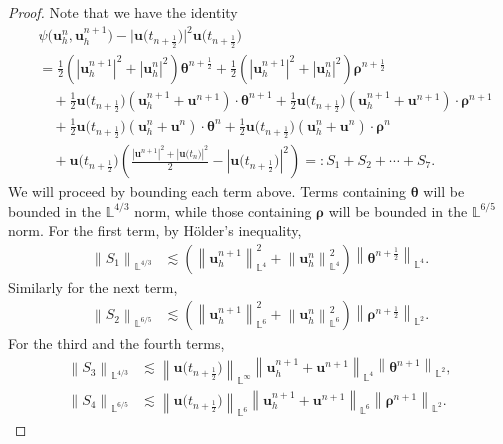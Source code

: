\documentclass[11pt, reqno]{amsart}
\theoremstyle{definition}
\theoremstyle{remark}
\numberwithin{equation}{section}
\newcommand{\bff}{\boldsymbol}
\newcommand{\bb}{\mathbb}
\newcommand{\norm}[2]{\left\|{#1}\right\|_{#2}}
\newcommand{\abs}[1]{\left|{#1}\right|}
\begin{document}
\begin{proof}
Note that we have the identity
\begin{align}\label{equ:psi u2u}
	\nonumber
	&\psi\big(\bff{u}_h^n, \bff{u}_h^{n+1}\big) - \big|\bff{u}\big(t_{n+\frac{1}{2}}\big)\big|^2 \bff{u}\big(t_{n+\frac{1}{2}}\big)
	\\
	\nonumber
	&=
	\frac{1}{2} \left(|\bff{u}_h^{n+1}|^2 + |\bff{u}_h^n|^2 \right)  \bff{\theta}^{n+\frac{1}{2}} + \frac{1}{2} \left(|\bff{u}_h^{n+1}|^2 + |\bff{u}_h^n|^2 \right) \bff{\rho}^{n+\frac{1}{2}} 
	\\
	\nonumber
	&\quad
	+
	\frac{1}{2} \bff{u}\big(t_{n+\frac{1}{2}}\big) \left( \bff{u}_h^{n+1}+ \bff{u}^{n+1} \right) \cdot \bff{\theta}^{n+1}
	+ \frac{1}{2} \bff{u}\big(t_{n+\frac{1}{2}}\big) \left( \bff{u}_h^{n+1}+ \bff{u}^{n+1} \right) \cdot \bff{\rho}^{n+1}
	\\
	\nonumber
	&\quad
	+
	\frac{1}{2} \bff{u}\big(t_{n+\frac{1}{2}}\big) \left( \bff{u}_h^n+ \bff{u}^n \right) \cdot \bff{\theta}^n
	+ \frac{1}{2} \bff{u}\big(t_{n+\frac{1}{2}}\big) \left( \bff{u}_h^n+ \bff{u}^n \right) \cdot \bff{\rho}^n
	\\
	&\quad
	+
	\bff{u}\big(t_{n+\frac{1}{2}}\big) \left(\frac{\abs{\bff{u}^{n+1}}^2 + \abs{\bff{u} \big(t_n\big)}^2}{2} - \abs{\bff{u}\big(t_{n+\frac{1}{2}}\big)}^2 \right)
	=: S_1+S_2+\cdots+S_7.
\end{align}
We will proceed by bounding each term above. Terms containing $\bff{\theta}$ will be bounded in the $\bb{L}^{4/3}$ norm, while those containing $\bff{\rho}$ will be bounded in the $\bb{L}^{6/5}$ norm. For the first term, by H\"older's inequality,
\begin{align*}
	\norm{S_1}{\bb{L}^{4/3}}
	&\lesssim
	\left(\norm{\bff{u}_h^{n+1}}{\bb{L}^4}^2 + \norm{\bff{u}_h^n}{\bb{L}^4}^2 \right) \norm{\bff{\theta}^{n+\frac{1}{2}}}{\bb{L}^4}.
\end{align*}
Similarly for the next term,
\begin{align*}
	\norm{S_2}{\bb{L}^{6/5}}
	&\lesssim
	\left(\norm{\bff{u}_h^{n+1}}{\bb{L}^6}^2 + \norm{\bff{u}_h^n}{\bb{L}^6}^2 \right) \norm{\bff{\rho}^{n+\frac{1}{2}}}{\bb{L}^2}.
\end{align*}
For the third and the fourth terms,
\begin{align*}
	\norm{S_3}{\bb{L}^{4/3}}
	&\lesssim
	\norm{\bff{u}\big(t_{n+\frac{1}{2}}\big)}{\bb{L}^\infty} \norm{\bff{u}_h^{n+1}+ \bff{u}^{n+1}}{\bb{L}^4} \norm{\bff{\theta}^{n+1}}{\bb{L}^2},
	\\
	\norm{S_4}{\bb{L}^{6/5}}
	&\lesssim
	\norm{\bff{u}\big(t_{n+\frac{1}{2}}\big)}{\bb{L}^6} \norm{\bff{u}_h^{n+1}+ \bff{u}^{n+1}}{\bb{L}^6} \norm{\bff{\rho}^{n+1}}{\bb{L}^2}.

\end{align*}
\end{proof}
\end{document}
